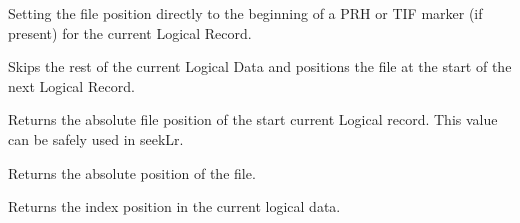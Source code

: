\documentclass[letterpaper,10pt,english]{sphinxmanual}
\begin{document}
\begin{fulllineitems}
\begin{fulllineitems}
\end{fulllineitems}


\begin{fulllineitems}
\label{\detokenize{ref/LIS/core/File:TotalDepth.LIS.core.File.FileRead.seekCurrentLrStart}}
Setting the file position directly to the beginning of
a PRH or TIF marker (if present) for the current Logical Record.

\end{fulllineitems}


\begin{fulllineitems}
\label{\detokenize{ref/LIS/core/File:TotalDepth.LIS.core.File.FileRead.skipToNextLr}}
Skips the rest of the current Logical Data and positions the file at
the start of the next Logical Record.

\end{fulllineitems}


\begin{fulllineitems}
\label{\detokenize{ref/LIS/core/File:TotalDepth.LIS.core.File.FileRead.tellLr}}
Returns the absolute file position of the start current Logical
record. This value can be safely used in seekLr.

\end{fulllineitems}


\begin{fulllineitems}
\label{\detokenize{ref/LIS/core/File:TotalDepth.LIS.core.File.FileRead.tell}}
Returns the absolute position of the file.

\end{fulllineitems}


\begin{fulllineitems}
\label{\detokenize{ref/LIS/core/File:TotalDepth.LIS.core.File.FileRead.ldIndex}}
Returns the index position in the current logical data.


\end{fulllineitems}
\end{fulllineitems}
\end{document}
